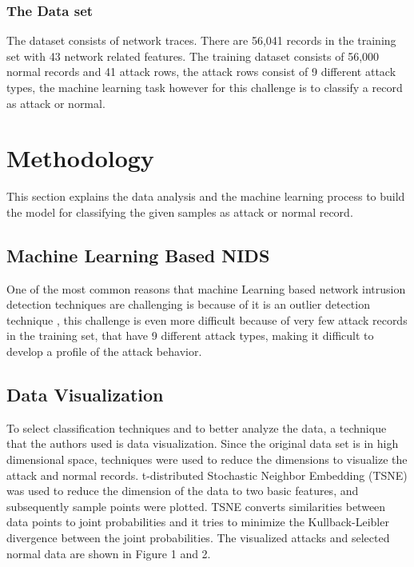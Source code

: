 \documentclass{llncs}
\begin{document}
\subsubsection{The Data set}
The dataset consists of network traces. There are 56,041 records in the training set with 43 network related features. The training dataset consists of 56,000 normal records and 41 attack rows, the attack rows consist of 9 different attack types, the machine learning task however for this challenge is to classify a record as attack or normal.

\section{Methodology}
This section explains the data analysis and the machine learning process to build the model for classifying the given samples as attack  or normal record. 

\subsection{Machine Learning Based NIDS}
One of the most common reasons that machine Learning based network intrusion detection techniques are challenging is because of it is an outlier detection technique \cite{Garcia:etal}, this challenge is even more difficult because of very few attack records in the training set, that have 9 different attack types, making it difficult to develop a profile of the attack behavior.

\subsection{Data Visualization}
To select classification techniques and to better analyze the data, a technique that the authors used is data visualization. Since the original data set is in high dimensional space, techniques were used to reduce the dimensions to visualize the attack and normal records. t-distributed Stochastic Neighbor Embedding (TSNE) was used to reduce the dimension of the data to two basic features, and subsequently sample points were plotted. TSNE converts similarities between data points to joint probabilities and it tries to minimize the Kullback-Leibler divergence between the joint probabilities. The visualized attacks and selected normal data are shown in Figure 1 and 2.
\end{document}
